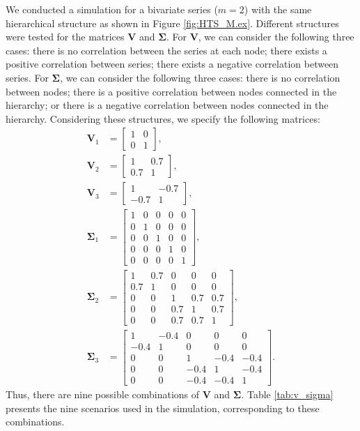 \documentclass[a4paper,preprint,11pt,authoryear]{elsarticle}
\begin{document}
We conducted a simulation for a bivariate series ($m = 2$) with the same hierarchical structure as shown in Figure \ref{fig:HTS_M.ex}. Different structures were tested for the matrices $\bm{V}$ and $\bm{\Sigma}$. For $\bm{V}$, we can consider the following three cases: there is no correlation between the series at each node; there exists a positive correlation between series; there exists a negative correlation between series. For $\bm{\Sigma}$, we can consider the following three cases: there is no correlation between nodes; there is a positive correlation between nodes connected in the hierarchy; or there is a negative correlation between nodes connected in the hierarchy. Considering these structures, we specify the following matrices:
\begin{align}
  \bm{V}_1 & =
  \begin{bmatrix}
    1 & 0 \\
    0 & 1
  \end{bmatrix}, \label{eq:V1} \\
  \bm{V}_2 & =
  \begin{bmatrix}
    1 & 0.7 \\
    0.7 & 1
  \end{bmatrix}, \label{eq:V2} \\
  \bm{V}_3 & =
  \begin{bmatrix}
    1 & -0.7 \\
    -0.7 & 1
  \end{bmatrix}, \label{eq:V3} \\
  \bm{\Sigma}_1 & =
  \begin{bmatrix}
    1 & 0 & 0 & 0 & 0 \\
    0 & 1 & 0 & 0 & 0 \\
    0 & 0 & 1 & 0 & 0 \\
    0 & 0 & 0 & 1 & 0 \\
    0 & 0 & 0 & 0 & 1
  \end{bmatrix}, \label{eq:Sigma1} \\
  \bm{\Sigma}_2 & =
  \begin{bmatrix}
    1 & 0.7 & 0 & 0 & 0 \\
    0.7 & 1 & 0 & 0 & 0 \\
    0 & 0 & 1 & 0.7 & 0.7 \\
    0 & 0 & 0.7 & 1 & 0.7 \\
    0 & 0 & 0.7 & 0.7 & 1
  \end{bmatrix}, \label{eq:Sigma2} \\
  \bm{\Sigma}_3 & =
  \begin{bmatrix}
    1 & -0.4 & 0 & 0 & 0 \\
    -0.4 & 1 & 0 & 0 & 0 \\
    0 & 0 & 1 & -0.4 & -0.4 \\
    0 & 0 & -0.4 & 1 & -0.4 \\
    0 & 0 & -0.4 & -0.4 & 1
  \end{bmatrix}. \label{eq:Sigma3}
\end{align}
Thus, there are nine possible combinations of $\bm{V}$ and $\bm{\Sigma}$. Table \ref{tab:v_sigma} presents the nine scenarios used in the simulation, corresponding to these combinations.
\end{document}
